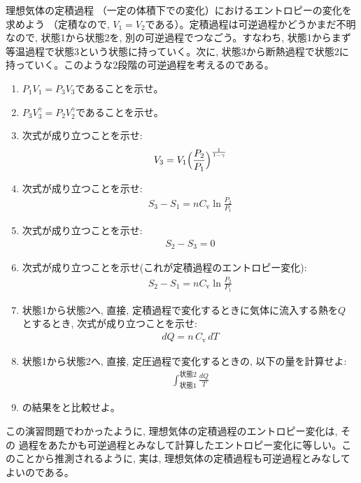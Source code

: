 \begin{exq}\label{exq:entropy_constV} 理想気体の定積過程
（一定の体積下での変化）におけるエントロピーの変化を求めよう
（定積なので, $V_1=V_2$である）。定積過程は可逆過程かどうかまだ不明なので, 状態1から状態2を, 
別の可逆過程でつなごう。すなわち, 状態1からまず等温過程で状態3という状態に持っていく。次に, 
状態3から断熱過程で状態2に持っていく。このような2段階の可逆過程を考えるのである。
\begin{enumerate}
\item $P_1V_1=P_3V_3$であることを示せ。
\item $P_3V_3^{\gamma}=P_2V_2^{\gamma}$であることを示せ。
\item 次式が成り立つことを示せ:
\begin{eqnarray}
V_3=V_1\Bigl(\frac{P_2}{P_1}\Bigr)^{\frac{1}{1-\gamma}}
\end{eqnarray}
\item 次式が成り立つことを示せ:
\begin{eqnarray}
S_3-S_1=nC_{\text{v}}\ln \frac{P_2}{P_1}
\end{eqnarray}
\item 次式が成り立つことを示せ:
\begin{eqnarray}
S_2-S_3=0
\end{eqnarray}
\item 次式が成り立つことを示せ(これが定積過程のエントロピー変化):
\begin{eqnarray}
S_2-S_1=nC_{\text{v}}\ln \frac{P_2}{P_1}\label{eq:entropy_constV6}
\end{eqnarray}
\item 状態1から状態2へ, 直接, 定積過程で変化するときに気体に流入する熱を$Q$
とするとき, 次式が成り立つことを示せ:
\begin{eqnarray}
dQ=n\,C_{\text{v}}\,dT
\end{eqnarray}
\item 状態1から状態2へ, 直接, 定圧過程で変化するときの, 以下の量を計算せよ:
\begin{eqnarray}
\int_{\text{状態1}}^{\text{状態2}} \frac{dQ}{T}\label{eq:entropy_constV8}
\end{eqnarray}
\item {}の結果をと比較せよ。
\end{enumerate}
\end{exq}

この演習問題でわかったように, 理想気体の定積過程のエントロピー変化は, その
過程をあたかも可逆過程とみなして計算したエントロピー変化に等しい。このことから推測されるように, 
実は, 理想気体の定積過程も可逆過程とみなしてよいのである。



